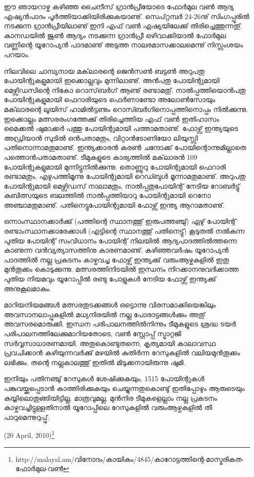 ﻿
\vskip 2pt

ഈ ഞായറാഴ്ച കഴിഞ്ഞ ചൈനീസ് ഗ്രാന്‍പ്രീയോടെ ഫോര്‍മുല വണ്‍ ആദ്യ എഷ്യന്‍പാദം പൂര്‍ത്തിയാക്കിയിരിക്കുകയാണു്. 
സെപ്റ്റമ്പര്‍ 24-26നു് സിംഗപ്പൂരില്‍ നടക്കുന്ന ഗ്രാന്‍പ്രീയിലാണു് ഇനി എഫ് വണ്‍ എഷ്യയിലേക്കു് തിരിച്ചെത്തുന്നതു്.
കാനഡയില്‍ ജൂണ്‍ ആദ്യം നടക്കുന്ന ഗ്രാന്‍പ്രീ ഒഴിവാക്കിയാല്‍ ഫോര്‍മുല വണ്ണിന്റെ യൂറോപ്യന്‍ പാദമാണു് അടുത്ത 
നാലരമാസക്കാലമെന്നു് നിസ്സംശയം പറയാം.

നിലവിലെ ചാമ്പ്യനായ മക്‌ലാരന്റെ ജെന്‍സണ്‍ ബട്ടണ്‍ അറുപതു പോയിന്റുകളുമായി ഇക്കൊല്ലവും മുന്നിലാണു്. 
അന്‍പതു പോയിന്റുമായി മെഴ്സിഡസിന്റെ നികോ റൊസ്‌ബര്‍ഗ് ആണു് രണ്ടാമതു്. നാല്‍പ്പത്തിയൊന്‍പതു പോയിന്റുകളുമായി 
ഫെറാരിയുടെ ഫെര്‍ണാണ്ടോ അലോണ്‍സോയും മക്‌ലാരന്റെ ലൂയിസ് ഹാമില്‍ട്ടണും റൊസ്ബര്‍ഗിനൊപ്പത്തിനൊപ്പം 
നില്‍ക്കുന്നു. ഇക്കൊല്ലം മത്സരരംഗത്തേക്കു് തിരിച്ചെത്തിയ എഫ് വണ്‍ ഇതിഹാസം മൈക്കല്‍ ഷുമാക്കര്‍ പത്തു 
പോയിന്റുമായി പത്താമതാണു്. ഫോഴ്സ് ഇന്ത്യയുടെ അഡ്രിയാന്‍ സുടില്‍ ഒന്‍പതാമതും, വിറ്റാന്‍ടോണിയോ ലിയുസ്സി 
പതിനൊന്നാമതുമാണു്. ഇന്ത്യക്കാരന്‍ കരണ്‍ ചന്ദോക്ക് പോയിന്റൊന്നുമില്ലാതെ പത്തൊന്‍പതാമതാണു്. ടീമുകളുടെ 
കാര്യത്തില്‍ മക്‌ലാരന്‍ 109 പോയിന്റുകളുമായി മുന്നിട്ടുനില്‍ക്കുന്നു. തൊണ്ണൂറു പോയിന്റുമായി ഫെറാരി രണ്ടാമതും, 
എഴുപത്തിമൂന്നു പോയിന്റുമായി റെഡ്ബുള്‍ മൂന്നാമതുമാണു്. അറുപതു പോയിന്റുമായി മെഴ്സിഡസ് നാലാമതും, 
നാല്‍പ്പതുപോയിന്റ് നേടിയ റോബര്‍ട്ടു് കുബിത്സയുടെ ബലത്തില്‍ നാല്‍പ്പത്തിയാറു പോയിന്റുമായി റെനോ 
അഞ്ചാമതുമാണു്. പതിനെട്ടുപോയിന്റുമായി ഫോഴ്സ് ഇന്ത്യ ആറാമതാണു്.

ഒന്നാംസ്ഥാനക്കാര്‍ക്കു് (പത്തിന്റെ സ്ഥാനത്തു് ഇരുപത്തഞ്ചു്) ഏഴു് പോയിന്റ് രണ്ടാംസ്ഥാനക്കാരേക്കാള്‍ (എട്ടിന്റെ 
സ്ഥാനത്തു് പതിനെട്ടു്) കൂടുതല്‍ നല്‍കുന്ന പുതിയ പോയിന്റ് സംവിധാനം പോയിന്റ് നിലയില്‍ ആദ്യപാദത്തില്‍ത്തന്നെ 
കാണുന്ന വന്‍വ്യത്യാസത്തിനു കാരണമാണു്. കഴിഞ്ഞവര്‍ഷം യൂറോപ്യന്‍ പാദത്തില്‍ നല്ല പ്രകടനം കാഴ്ചവച്ച 
ഫോഴ്സ് ഇന്ത്യക്കു് വരുംആഴ്ചകളില്‍ ഇതു മുന്‍തൂക്കം കൊടുക്കുന്നു. മത്സരത്തിനിടയില്‍ ഇന്ധനം നിറക്കാനനുവദിക്കാത്ത 
പുതിയ നിയമവും യൂറോപ്പില്‍ രണ്ടു പോളുകള്‍ നേടിയ ഫോഴ്സ് ഇന്ത്യക്കു് അനുകൂലമാകും.

മാറിയനിയമങ്ങള്‍ മത്സരതുടക്കങ്ങള്‍ ഒട്ടൊന്നു വിരസമാക്കിയെങ്കിലും അവസാനലാപ്പുകളില്‍ മധ്യനിരയില്‍ നല്ല 
പോരാട്ടങ്ങള്‍ക്കും അതു് അവസരമൊരുക്കി. ഇന്ധന പരിപാലനത്തില്‍നിന്നും ടീമുകളുടെ ശ്രദ്ധ ടയര്‍ 
പരിപാലനത്തിലേക്കുമാറിയതോടെ, വണ്‍ സ്റ്റോപ്പ് സ്ട്രാറ്റജി സര്‍‌വ്വസാധാരണമായി. അതുകൊണ്ടുതന്നെ, കൃത്യമായി 
കാലാവസ്ഥ പ്രവചിക്കാന്‍ കഴിയുന്നവര്‍ക്കു് മഴയില്‍ കുതിര്‍ന്ന റേസുകളില്‍ വലിയമുന്‍തൂക്കം ലഭിക്കും. തന്റെ നല്ലകാലത്തു് 
ഇതില്‍ മിടുക്കനായിരുന്നു ഷുമി.

ഇനിയും പതിനഞ്ചു് റേസുകള്‍ ശേഷിക്കുകയും, 1515 പോയിന്റുകള്‍ പങ്കുവയ്ക്കപ്പെടാന്‍ കാത്തിരിക്കുകയും ചെയ്യുന്നതുകൊണ്ടു് 
ഇതിപ്പോഴും ആരുടെയും കയ്യിലൊതുങ്ങിയിട്ടില്ല. മാത്രവുമല്ല, മുന്‍നിര ടീമുകളെല്ലാം നല്ല പ്രകടനം കാഴ്ചവച്ചിട്ടുള്ളതിനാല്‍ 
യൂറോപ്പിലെ റേസുകളില്‍ വരുംആഴ്ചകളില്‍ തീ പാറുമെന്നുറുപ്പു്. 

\hspace*{2em}(20 April, 2010)\footnote{http://malayal.am/വിനോദം/കായികം/4845/കാറോട്ടത്തിന്റെ-മാസ്മരികത-ഫോര്‍മുല-വണ്‍}

\newpage
